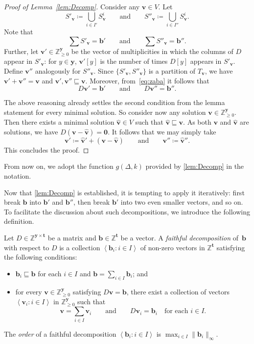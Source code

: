 \documentclass{theoretics}
\renewcommand{\geq}{\geqslant}
\newcommand{\cfleq}{\sqsubseteq}
\newcommand{\Z}{\mathbb{Z}}
\newcommand{\Zn}{\Z_{\geq 0}}
\newcommand{\tup}[1]{{\mathbf{#1}}}
\newcommand{\yy}{\tup y}
\newcommand{\tv}{\tup t}
\newcommand{\bb}{\tup b}
\newcommand{\myvv}{\tup v} %
\newcommand{\matrices}[3]{#1^{#2\times #3}}
\newcommand{\mset}[1]{\left\langle #1\right\rangle}
\begin{document}
\begin{proof}[Proof of Lemma~\ref{lem:Decomp}]
Consider any $\myvv\in V$. Let
$$S'_\myvv\coloneqq \bigcup_{i\in I'} S^i_\myvv\qquad \textrm{and}\qquad S''_\myvv\coloneqq \bigcup_{i\in I''} S^i_\myvv .$$
Note that
\begin{equation}\label{eq:zaba}
\sum S'_\myvv = \bb'\qquad \textrm{and}\qquad \sum S''_\myvv = \bb''.
\end{equation}
Further, let $\myvv'\in \Zn^{\yy}$ be the vector of multiplicities in which the columns of $D$ appear in $S'_\myvv$: for $y\in \yy$, $\myvv'[y]$ is the number of times $D[y]$ appears in $S'_\myvv$. Define $\myvv''$ analogously for $S''_\myvv$. Since $\{S'_\myvv,S''_\myvv\}$ is a partition of $T_\myvv$, we have $\myvv'+\myvv''=\myvv$ and $\myvv',\myvv''\cfleq \myvv$. Moreover, from~\cref{eq:zaba} it follows that
\begin{equation*}
D\myvv' = \bb'\qquad \textrm{and}\qquad D\myvv'' = \bb''.
\end{equation*}

\newcommand{\whvv}{\widehat{\myvv}}

The above reasoning already settles the second condition from the lemma statement for every minimal solution. So consider now any solution $\myvv\in \Zn^\yy$. Then there exists a minimal solution $\whvv\in V$ such that $\whvv\cfleq \myvv$. As both $\myvv$ and $\whvv$ are solutions, we have $D(\myvv-\whvv)=\mathbf{0}$. It follows that we may simply take
$$\myvv'\coloneqq \whvv'+(\myvv-\whvv)\qquad \textrm{and}\qquad \myvv''\coloneqq \whvv''.$$
This concludes the proof.
\end{proof}

From now on, we adopt the function $g(\Delta,k)$ provided by \cref{lem:Decomp} in the notation.

Now that \cref{lem:Decomp} is established, it is tempting to apply it iteratively: first break $\bb$ into $\bb'$ and $\bb''$, then break $\bb'$ into two even smaller vectors, and so on. To facilitate the discussion about such decompositions, we introduce the following definition.

\begin{definition}
    Let $D\in \matrices{\Z}{\yy}{\tv}$ be a matrix and $\bb\in \Z^\tv$ be a vector. A {\em{faithful decomposition}} of~$\bb$ with respect to $D$ is a collection $\mset{\bb_i\colon i\in I}$ of non-zero vectors in $\Z^\tv$ satisfying the following conditions:
\begin{itemize}[nosep]
    \item $\bb_i\cfleq \bb$ for each $i\in I$ and $\bb=\sum_{i\in I} \bb_i$; and
    \item for every $\myvv\in \Zn^{\yy}$ satisfying $D\myvv=\bb$, there exist a collection of vectors $\mset{\myvv_i\colon i\in I}$ in $\Zn^{\yy}$ such that
    $$\myvv=\sum_{i\in I} \myvv_i\qquad \textrm{and} \qquad D\myvv_i=\bb_i\quad\textrm{for each }i\in I.$$
\end{itemize}
The {\em{order}} of a faithful decomposition $\mset{\bb_i\colon i\in I}$ is $\max_{i\in I} \|\bb_i\|_\infty$.
\end{definition}
\end{document}
